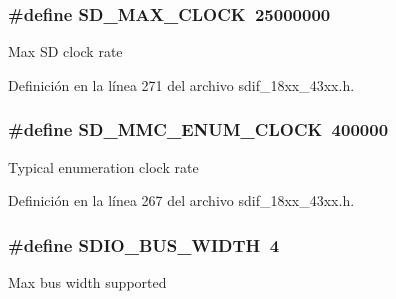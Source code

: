 \subsubsection[{\texorpdfstring{S\+D\+\_\+\+M\+A\+X\+\_\+\+C\+L\+O\+CK}{SD_MAX_CLOCK}}]{\setlength{\rightskip}{0pt plus 5cm}\#define S\+D\+\_\+\+M\+A\+X\+\_\+\+C\+L\+O\+CK~25000000}\hypertarget{group___s_d_i_f__18_x_x__43_x_x_ga50ae496516159edcb24dde1c947f1865}{}\label{group___s_d_i_f__18_x_x__43_x_x_ga50ae496516159edcb24dde1c947f1865}
Max SD clock rate 

Definición en la línea 271 del archivo sdif\+\_\+18xx\+\_\+43xx.\+h.

\subsubsection[{\texorpdfstring{S\+D\+\_\+\+M\+M\+C\+\_\+\+E\+N\+U\+M\+\_\+\+C\+L\+O\+CK}{SD_MMC_ENUM_CLOCK}}]{\setlength{\rightskip}{0pt plus 5cm}\#define S\+D\+\_\+\+M\+M\+C\+\_\+\+E\+N\+U\+M\+\_\+\+C\+L\+O\+CK~400000}\hypertarget{group___s_d_i_f__18_x_x__43_x_x_ga495b4ec71ba467ec70b848dd658f0733}{}\label{group___s_d_i_f__18_x_x__43_x_x_ga495b4ec71ba467ec70b848dd658f0733}
Typical enumeration clock rate 

Definición en la línea 267 del archivo sdif\+\_\+18xx\+\_\+43xx.\+h.

\subsubsection[{\texorpdfstring{S\+D\+I\+O\+\_\+\+B\+U\+S\+\_\+\+W\+I\+D\+TH}{SDIO_BUS_WIDTH}}]{\setlength{\rightskip}{0pt plus 5cm}\#define S\+D\+I\+O\+\_\+\+B\+U\+S\+\_\+\+W\+I\+D\+TH~4}\hypertarget{group___s_d_i_f__18_x_x__43_x_x_gadf0203becc22d5e88d858933cc32f734}{}\label{group___s_d_i_f__18_x_x__43_x_x_gadf0203becc22d5e88d858933cc32f734}
Max bus width supported 

